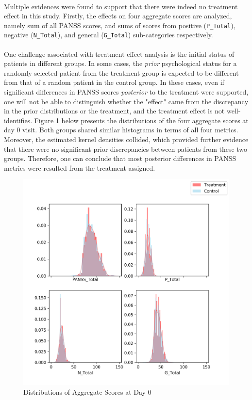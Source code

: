 \documentclass[11pt]{article}
\begin{document}
	\paragraph{}Multiple evidences were found to support that there were indeed no treatment effect in this study. Firstly, the effects on four aggregate scores are analyzed, namely sum of all PANSS scores, and sums of scores from positive (\texttt{P\_Total}), negative (\texttt{N\_Total}), and general (\texttt{G\_Total}) sub-categories respectively.
	
	\paragraph{}One challenge associated with treatment effect analysis is the initial status of patients in different groups. In some cases, the \emph{prior} psychological status for a randomly selected patient from the treatment group is expected to be different from that of a random patient in the control group. In these cases, even if significant differences in PANSS scores \emph{posterior} to the treatment were supported, one will not be able to distinguish whether the "effect" came from the discrepancy in the prior distributions or the treatment, and the treatment effect is not well-identifies.
	Figure 1 below presents the distributions of the four aggregate scores at day 0 visit. Both groups shared similar histograms in terms of all four metrics. Moreover, the estimated kernel densities collided, which provided further evidence that there were no significant prior discrepancies between patients from these two groups. Therefore, one can conclude that most posterior differences in PANSS metrics were resulted from the treatment assigned.

	\begin{figure}[H]
		\centering
		\includegraphics[width=0.7\linewidth]{figures/dist_initial_scores.png}
		\caption{Distributions of Aggregate Scores at Day 0}
	\end{figure}
\end{document}
